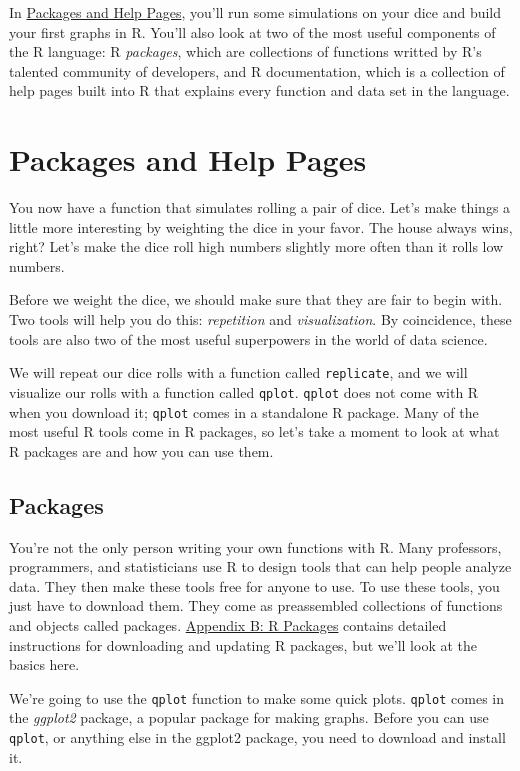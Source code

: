 \documentclass[
  letterpaper,
  DIV=11,
  numbers=noendperiod]{scrbook}
\begin{document}
In \hyperref[sec-packages-and-help]{Packages and Help Pages}, you'll run
some simulations on your dice and build your first graphs in R. You'll
also look at two of the most useful components of the R language: R
\emph{packages}, which are collections of functions writted by R's
talented community of developers, and R documentation, which is a
collection of help pages built into R that explains every function and
data set in the language.

\chapter{Packages and Help Pages}\label{sec-packages-and-help}

You now have a function that simulates rolling a pair of dice. Let's
make things a little more interesting by weighting the dice in your
favor. The house always wins, right? Let's make the dice roll high
numbers slightly more often than it rolls low numbers.

Before we weight the dice, we should make sure that they are fair to
begin with. Two tools will help you do this: \emph{repetition} and
\emph{visualization}. By coincidence, these tools are also two of the
most useful superpowers in the world of data science.

We will repeat our dice rolls with a function called \texttt{replicate},
and we will visualize our rolls with a function called \texttt{qplot}.
\texttt{qplot} does not come with R when you download it; \texttt{qplot}
comes in a standalone R package. Many of the most useful R tools come in
R packages, so let's take a moment to look at what R packages are and
how you can use them.

\section{Packages}\label{packages}

You're not the only person writing your own functions with R. Many
professors, programmers, and statisticians use R to design tools that
can help people analyze data. They then make these tools free for anyone
to use. To use these tools, you just have to download them. They come as
preassembled collections of functions and objects called packages.
\hyperref[sec-appendix-packages]{Appendix B: R Packages} contains
detailed instructions for downloading and updating R packages, but we'll
look at the basics here.

We're going to use the \texttt{qplot} function to make some quick plots.
\texttt{qplot} comes in the \emph{ggplot2} package, a popular package
for making graphs. Before you can use \texttt{qplot}, or anything else
in the ggplot2 package, you need to download and install it.
\end{document}
